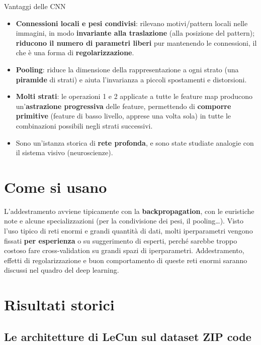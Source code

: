 \begin{boxabstract}{Vantaggi delle CNN}

\begin{itemize}
\tightlist
\item
  \textbf{Connessioni locali e pesi condivisi}: rilevano motivi/pattern
  locali nelle immagini, in modo \textbf{invariante alla traslazione}
  (alla posizione del pattern); \textbf{riducono il numero di parametri
  liberi} pur mantenendo le connessioni, il che è una forma di
  \textbf{regolarizzazione}.
\item
  \textbf{Pooling}: riduce la dimensione della rappresentazione a ogni
  strato (una \textbf{piramide} di strati) e aiuta l'invarianza a
  piccoli spostamenti e distorsioni.
\item
  \textbf{Molti strati}: le operazioni 1 e 2 applicate a tutte le
  feature map producono un'\textbf{astrazione progressiva} delle
  feature, permettendo di \textbf{comporre primitive} (feature di basso
  livello, apprese una volta sola) in tutte le combinazioni possibili
  negli strati successivi.
\item
  Sono un'istanza storica di \textbf{rete profonda}, e sono state
  studiate analogie con il sistema visivo (neuroscienze).
\end{itemize}

\end{boxabstract}

\section{Come si usano}\label{come-si-usano}

L'addestramento avviene tipicamente con la \textbf{backpropagation}, con
le euristiche note e alcune specializzazioni (per la condivisione dei
pesi, il pooling\ldots). Visto l'uso tipico di reti enormi e grandi
quantità di dati, molti iperparametri vengono fissati \textbf{per
esperienza} o su suggerimento di esperti, perché sarebbe troppo costoso
fare cross-validation su grandi spazi di iperparametri. Addestramento,
effetti di regolarizzazione e buon comportamento di queste reti enormi
saranno discussi nel quadro del deep learning.

\section{Risultati storici}\label{risultati-storici}

\subsection{Le architetture di LeCun sul dataset ZIP
code}\label{le-architetture-di-lecun-sul-dataset-zip-code}

